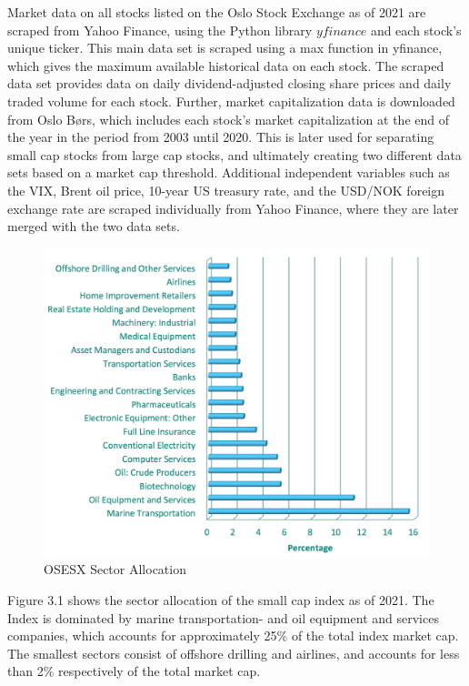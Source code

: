 Market data on all stocks listed on the Oslo Stock Exchange as of 2021 are scraped from Yahoo Finance, using the Python library $\textit{yfinance}$ and each stock's unique ticker. This main data set is scraped using a max function in yfinance, which gives the maximum available historical data on each stock. The scraped data set provides data on daily dividend-adjusted closing share prices and daily traded volume for each stock. Further, market capitalization data is downloaded from Oslo Børs, which includes each stock's market capitalization at the end of the year in the period from 2003 until 2020. This is later used for separating small cap stocks from large cap stocks, and ultimately creating two different data sets based on a market cap threshold. Additional independent variables such as the VIX, Brent oil price, 10-year US treasury rate, and the USD/NOK foreign exchange rate are scraped individually from Yahoo Finance, where they are later merged with the two data sets.  
\indent\newline 
\begin{figure}[H]
\centering
\includegraphics [scale=0.44,angle=360]{figures/smallsector.png}
\caption{OSESX Sector Allocation \cite{euronext}}
\label{fig:smallsector}
\end{figure}
\indent\newline 
Figure 3.1 shows the sector allocation of the small cap index as of 2021. The Index is dominated by marine transportation- and oil equipment and services companies, which accounts for approximately 25\% of the total index market cap. The smallest sectors consist of offshore drilling and airlines, and accounts for less than 2\% respectively of the total market cap.   

